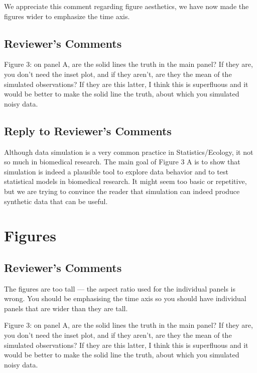 \documentclass[
]{article}
\begin{document}
We appreciate this comment regarding figure aesthetics, we have now made the figures wider to emphasize the time axis.

\hypertarget{reviewers-comments-14}{%
\subsection{Reviewer's Comments}\label{reviewers-comments-14}}

Figure 3: on panel A, are the solid lines the truth in the main panel? If they are, you don't need the inset plot, and if they aren't, are they the mean of the simulated observations? If they are this latter, I think this is superfluous and it would be better to make the solid line the truth, about which you simulated noisy data.

\hypertarget{section-15}{%
\subsection{\texorpdfstring{\textcolor{reviewersblue} {Reply to Reviewer's Comments}}{}}\label{section-15}}

Although data simulation is a very common practice in Statistics/Ecology, it not so much in biomedical research. The main goal of Figure 3 A is to show that simulation is indeed a plausible tool to explore data behavior and to test statistical models in biomedical research. It might seem too basic or repetitive, but we are trying to convince the reader that simulation can indeed produce synthetic data that can be useful.

\hypertarget{figures-1}{%
\section{Figures}\label{figures-1}}

\hypertarget{reviewers-comments-15}{%
\subsection{Reviewer's Comments}\label{reviewers-comments-15}}

The figures are too tall --- the aspect ratio used for the individual panels is wrong. You should be emphasising the time axis so you should have individual panels that are wider than they are tall.

Figure 3: on panel A, are the solid lines the truth in the main panel? If they are, you don't need the inset plot, and if they aren't, are they the mean of the simulated observations? If they are this latter, I think this is superfluous and it would be better to make the solid line the truth, about which you simulated noisy data.
\end{document}
